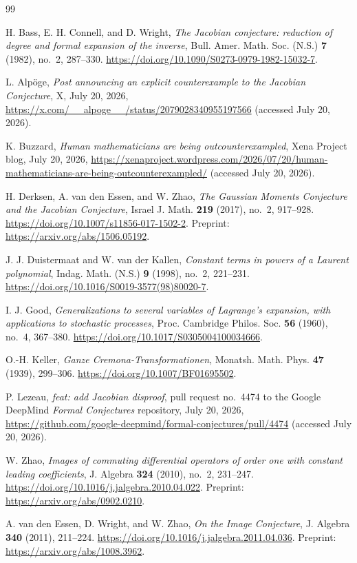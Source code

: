 \documentclass[11pt]{article}
\theoremstyle{remark}
\begin{document}
\begin{thebibliography}{99}

H. Bass, E. H. Connell, and D. Wright,
\emph{The Jacobian conjecture: reduction of degree and formal expansion of the inverse},
Bull. Amer. Math. Soc. (N.S.) \textbf{7} (1982), no.~2, 287--330.
\url{https://doi.org/10.1090/S0273-0979-1982-15032-7}.

L. Alp\"oge,
\emph{Post announcing an explicit counterexample to the Jacobian Conjecture},
X, July 20, 2026,
\url{https://x.com/__alpoge__/status/2079028340955197566}
(accessed July 20, 2026).

K. Buzzard,
\emph{Human mathematicians are being outcounterexampled},
Xena Project blog, July 20, 2026,
\url{https://xenaproject.wordpress.com/2026/07/20/human-mathematicians-are-being-outcounterexampled/}
(accessed July 20, 2026).

H. Derksen, A. van den Essen, and W. Zhao,
\emph{The Gaussian Moments Conjecture and the Jacobian Conjecture},
Israel J. Math. \textbf{219} (2017), no.~2, 917--928.
\url{https://doi.org/10.1007/s11856-017-1502-2}.
Preprint: \url{https://arxiv.org/abs/1506.05192}.

J. J. Duistermaat and W. van der Kallen,
\emph{Constant terms in powers of a Laurent polynomial},
Indag. Math. (N.S.) \textbf{9} (1998), no.~2, 221--231.
\url{https://doi.org/10.1016/S0019-3577(98)80020-7}.

I. J. Good,
\emph{Generalizations to several variables of Lagrange's expansion, with applications to stochastic processes},
Proc. Cambridge Philos. Soc. \textbf{56} (1960), no.~4, 367--380.
\url{https://doi.org/10.1017/S0305004100034666}.

O.-H. Keller,
\emph{Ganze Cremona-Transformationen},
Monatsh. Math. Phys. \textbf{47} (1939), 299--306.
\url{https://doi.org/10.1007/BF01695502}.

P. Lezeau,
\emph{feat: add Jacobian disproof},
pull request no.~4474 to the Google DeepMind \emph{Formal Conjectures} repository,
July 20, 2026,
\url{https://github.com/google-deepmind/formal-conjectures/pull/4474}
(accessed July 20, 2026).

W. Zhao,
\emph{Images of commuting differential operators of order one with constant leading coefficients},
J. Algebra \textbf{324} (2010), no.~2, 231--247.
\url{https://doi.org/10.1016/j.jalgebra.2010.04.022}.
Preprint: \url{https://arxiv.org/abs/0902.0210}.

A. van den Essen, D. Wright, and W. Zhao,
\emph{On the Image Conjecture},
J. Algebra \textbf{340} (2011), 211--224.
\url{https://doi.org/10.1016/j.jalgebra.2011.04.036}.
Preprint: \url{https://arxiv.org/abs/1008.3962}.

\end{thebibliography}
\end{document}
